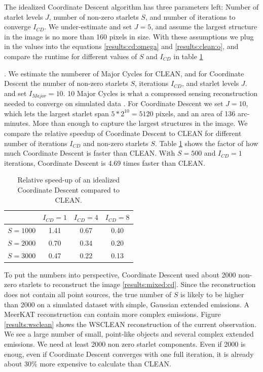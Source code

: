 The idealized Coordinate Descent algorithm has three parameters left: Number of starlet levels $J$, number of non-zero starlets $S$, and number of iterations to converge $I_{CD}$. We under-estimate and set $J=5$, and assume the largest structure in the image is no more than 160 pixels in size. With these assumptions we plug in the values into the equations \eqref{results:cd:omega} and \eqref{results:clean:o}, and compare the runtime for different values of $S$ and $I_{CD}$ in table \ref{res:cd:table}
	
	. We estimate the numberer of Major Cycles  for CLEAN, and for Coordinate Descent the  number of non-zero starlets $S$, iterations $I_{CD}$, and starlet levels $J$. and set $I_{Major} = 10$. 10 Major Cycles is what a compressed sensing reconstruction needed to converge on simulated data \cite{pratley2018fast}. For Coordinate Descent we set $J = 10$, which lets the largest starlet span $5*2^{10} = 5120$ pixels, and an area of 136 arc-minutes. More than enough to capture the largest structures in the image. We compare the relative speedup of Coordinate Descent to CLEAN for different number of iterations $I_{CD}$ and non-zero starlets $S$. Table \ref{res:cd:table} shows the factor of how much Coordinate Descent is faster than CLEAN. With $S=500$ and $I_{CD} = 1$ iterations, Coordinate Descent is 4.69 times faster than CLEAN. 

\begin{table}[h!]
	\begin{center}
		\begin{tabular}{l|c|c|c} %
			 & $I_{CD} = 1$ & $I_{CD} = 4$ &  $I_{CD} = 8$\\
			\hline
			$S=1000$ & 1.41 & 0.67 & 0.40 \\
			$S=2000$ & 0.70 & 0.34 & 0.20 \\
			$S=3000$ & 0.47 & 0.22 & 0.13 \\
		\end{tabular}
		\caption{Relative speed-up of an idealized Coordinate Descent compared to CLEAN.}
		\label{res:cd:table}
	\end{center}
\end{table}

To put the numbers into perspective, Coordinate Descent used about 2000 non-zero starlets to reconstruct the image \ref{results:mixed:cd}. Since the reconstruction does not contain all point sources, the true number of $S$ is likely to be higher than 2000 on a simulated dataset with simple, Gaussian extended emissions. A MeerKAT reconstruction can contain more complex emissions. Figure \ref{results:wsclean} shows the WSCLEAN reconstruction of the current observation. We see a large number of small, point-like objects and several complex extended emissions. We need at least 2000 non zero starlet components. Even if 2000 is enoug, even if Coordinate Descent converges with one full iteration, it is already about 30\% more expensive to calculate than CLEAN.

